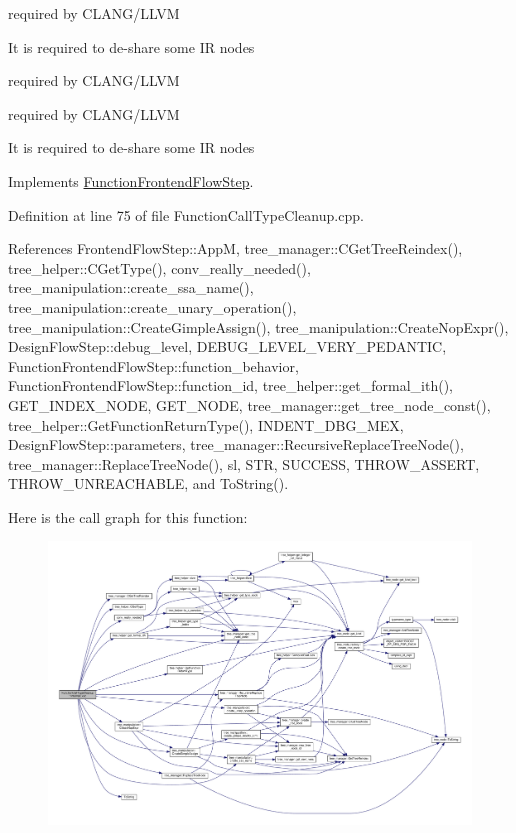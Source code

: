 required by C\+L\+A\+N\+G/\+L\+L\+VM

It is required to de-\/share some IR nodes

required by C\+L\+A\+N\+G/\+L\+L\+VM

required by C\+L\+A\+N\+G/\+L\+L\+VM

It is required to de-\/share some IR nodes 

Implements \hyperlink{classFunctionFrontendFlowStep_a00612f7fb9eabbbc8ee7e39d34e5ac68}{Function\+Frontend\+Flow\+Step}.



Definition at line 75 of file Function\+Call\+Type\+Cleanup.\+cpp.



References Frontend\+Flow\+Step\+::\+AppM, tree\+\_\+manager\+::\+C\+Get\+Tree\+Reindex(), tree\+\_\+helper\+::\+C\+Get\+Type(), conv\+\_\+really\+\_\+needed(), tree\+\_\+manipulation\+::create\+\_\+ssa\+\_\+name(), tree\+\_\+manipulation\+::create\+\_\+unary\+\_\+operation(), tree\+\_\+manipulation\+::\+Create\+Gimple\+Assign(), tree\+\_\+manipulation\+::\+Create\+Nop\+Expr(), Design\+Flow\+Step\+::debug\+\_\+level, D\+E\+B\+U\+G\+\_\+\+L\+E\+V\+E\+L\+\_\+\+V\+E\+R\+Y\+\_\+\+P\+E\+D\+A\+N\+T\+IC, Function\+Frontend\+Flow\+Step\+::function\+\_\+behavior, Function\+Frontend\+Flow\+Step\+::function\+\_\+id, tree\+\_\+helper\+::get\+\_\+formal\+\_\+ith(), G\+E\+T\+\_\+\+I\+N\+D\+E\+X\+\_\+\+N\+O\+DE, G\+E\+T\+\_\+\+N\+O\+DE, tree\+\_\+manager\+::get\+\_\+tree\+\_\+node\+\_\+const(), tree\+\_\+helper\+::\+Get\+Function\+Return\+Type(), I\+N\+D\+E\+N\+T\+\_\+\+D\+B\+G\+\_\+\+M\+EX, Design\+Flow\+Step\+::parameters, tree\+\_\+manager\+::\+Recursive\+Replace\+Tree\+Node(), tree\+\_\+manager\+::\+Replace\+Tree\+Node(), sl, S\+TR, S\+U\+C\+C\+E\+SS, T\+H\+R\+O\+W\+\_\+\+A\+S\+S\+E\+RT, T\+H\+R\+O\+W\+\_\+\+U\+N\+R\+E\+A\+C\+H\+A\+B\+LE, and To\+String().

Here is the call graph for this function\+:
\nopagebreak
\begin{figure}[H]
\begin{center}
\leavevmode
\includegraphics[width=350pt]{dd/d9e/classFunctionCallTypeCleanup_a2e3a025dd337bafdd96b26071ab18e69_cgraph}
\end{center}
\end{figure}



